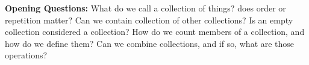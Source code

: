 \textbf{Opening Questions:} What do we call a collection of things?
does order or repetition matter? Can we contain collection of other collections? Is an empty collection
considered a collection? How do we count members of a collection, and how do we define them? Can we
combine collections, and if so, what are those operations?\\